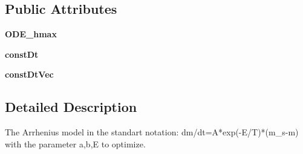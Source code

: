 \subsection*{\-Public \-Attributes}
\begin{DoxyCompactItemize}
\item 
\hypertarget{classModels_1_1ArrheniusModelNoB_a2d30c2c2ac26561a369e3378c3057bb4}{{\bfseries \-O\-D\-E\-\_\-hmax}}\label{classModels_1_1ArrheniusModelNoB_a2d30c2c2ac26561a369e3378c3057bb4}

\item 
\hypertarget{classModels_1_1ArrheniusModelNoB_afdf3d4c6cef8d0a613d4b99c936b136a}{{\bfseries const\-Dt}}\label{classModels_1_1ArrheniusModelNoB_afdf3d4c6cef8d0a613d4b99c936b136a}

\item 
\hypertarget{classModels_1_1Model_a3f71983de5f8b86bec47929213b900ec}{{\bfseries const\-Dt\-Vec}}\label{classModels_1_1Model_a3f71983de5f8b86bec47929213b900ec}

\end{DoxyCompactItemize}


\subsection{\-Detailed \-Description}
\begin{DoxyVerb}The Arrhenius model in the standart notation: dm/dt=A*exp(-E/T)*(m_s-m) with the parameter a,b,E to optimize.\end{DoxyVerb}
 

